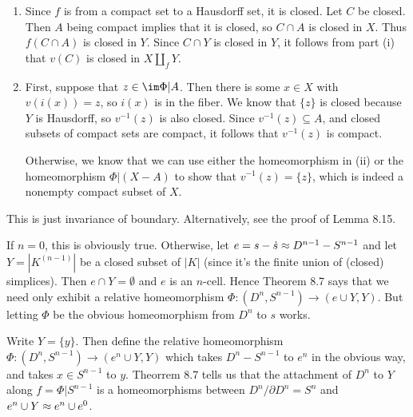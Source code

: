 \documentclass[../../solutions.tex]{subfiles}
\begin{document}
\begin{exercise} \leavevmode
\begin{enumerate}
\item
Since $f$ is from a compact set to a Hausdorff set, it is closed.
Let $C$ be closed.
Then $A$ being compact implies that it is closed, so $C\cap A$ is closed in $X$.
Thus $f(C\cap A)$ is closed in $Y$.
Since $C\cap Y$ is closed in $Y$, it follows from part (i) that $v(C)$ is closed in $X\amalg_fY$.

\item
First, suppose that $z\in\im\Phi|A$.
Then there is some $x\in X$ with $v(i(x))=z$, so $i(x)$ is in the fiber.
We know that $\{z\}$ is closed because $Y$ is Hausdorff, so $v^{-1}(z)$ is also closed.
Since $v^{-1}(z)\subseteq A$, and closed subsets of compact sets are compact, it follows that $v^{-1}(z)$ is compact.

Otherwise, we know that we can use either the homeomorphism in (ii) or the homeomorphism $\Phi|(X-A)$ to show that $v^{-1}(z)=\{z\}$, which is indeed a nonempty compact subset of $X$.
\end{enumerate}
\end{exercise}

\begin{exercise} \leavevmode
This is just invariance of boundary.
Alternatively, see the proof of Lemma 8.15.
\end{exercise}

\begin{exercise} \leavevmode
If $n=0$, this is obviously true.
Otherwise, let $e=s-\dot s\approx D^{n-1}-S^{n-1}$ and let $Y=|K^{(n-1)}|$ be a closed subset of $|K|$ (since it's the finite union of (closed) simplices).
Then $e\cap Y=\emptyset$ and $e$ is an $n$-cell.
Hence Theorem 8.7 says that we need only exhibit a relative homeomorphism $\Phi:(D^n,S^{n-1})\to(e\cup Y,Y)$.
But letting $\Phi$ be the obvious homeomorphism from $D^n$ to $s$ works.
\end{exercise}

\begin{exercise} \leavevmode
Write $Y=\{y\}$.
Then define the relative homeomorphism $\Phi:(D^n,S^{n-1})\to(e^n\cup Y,Y)$ which takes $D^n-S^{n-1}$ to $e^n$ in the obvious way, and takes $x\in S^{n-1}$ to $y$.
Theorrem 8.7 tells us that the attachment of $D^n$ to $Y$ along $f=\Phi|S^{n-1}$ is a homeomorphisms between $D^n/\partial D^n=S^n$ and $e^n\cup Y\approx e^n\cup e^0$.
\end{exercise}
\end{document}
